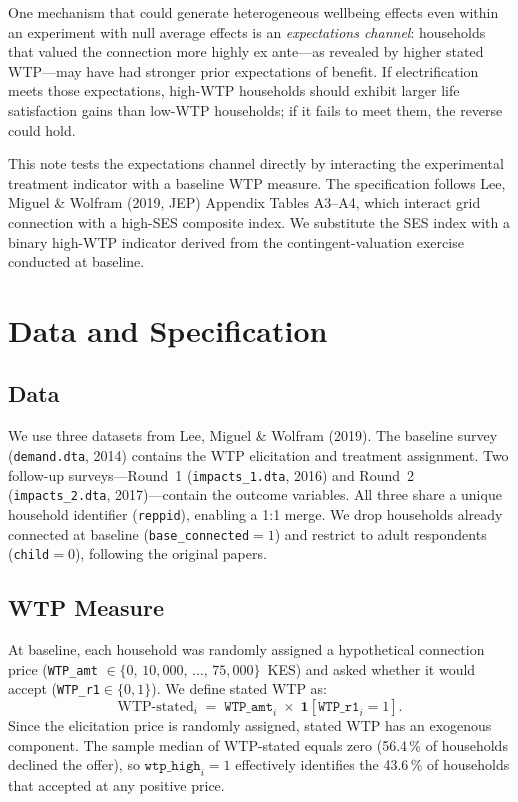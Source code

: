 \documentclass[12pt]{article}
\begin{document}
One mechanism that could generate heterogeneous wellbeing effects even
within an experiment with null average effects is an \emph{expectations
channel}: households that valued the connection more highly ex ante---as
revealed by higher stated WTP---may have had stronger prior expectations
of benefit. If electrification meets those expectations, high-WTP
households should exhibit larger life satisfaction gains than low-WTP
households; if it fails to meet them, the reverse could hold.

This note tests the expectations channel directly by interacting the
experimental treatment indicator with a baseline WTP measure. The
specification follows Lee, Miguel \& Wolfram (2019, JEP) Appendix
Tables A3--A4, which interact grid connection with a high-SES composite
index. We substitute the SES index with a binary high-WTP indicator
derived from the contingent-valuation exercise conducted at baseline.

\section{Data and Specification}
\label{sec:data}

\subsection*{Data}

We use three datasets from Lee, Miguel \& Wolfram (2019). The baseline
survey (\texttt{demand.dta}, 2014) contains the WTP elicitation and
treatment assignment. Two follow-up surveys---Round~1
(\texttt{impacts\_1.dta}, 2016) and Round~2 (\texttt{impacts\_2.dta},
2017)---contain the outcome variables. All three share a unique household
identifier (\texttt{reppid}), enabling a 1:1 merge. We drop households
already connected at baseline (\texttt{base\_connected}$=1$) and restrict
to adult respondents (\texttt{child}$=0$), following the original papers.

\subsection*{WTP Measure}

At baseline, each household was randomly assigned a hypothetical connection
price (\texttt{WTP\_amt} $\in \{0,\,10{,}000,\,\ldots,\,75{,}000\}$~KES)
and asked whether it would accept (\texttt{WTP\_r1}$\in\{0,1\}$). We
define stated WTP as:
\begin{equation}
\label{eq:wtp}
\text{WTP-stated}_i \;=\; \texttt{WTP\_amt}_i
  \;\times\; \mathbf{1}[\texttt{WTP\_r1}_i = 1].
\end{equation}
Since the elicitation price is randomly assigned, stated WTP has an
exogenous component. The sample median of WTP-stated equals zero (56.4\,\%
of households declined the offer), so
$\texttt{wtp\_high}_i = 1$ effectively identifies the 43.6\,\% of
households that accepted at any positive price.
\end{document}
